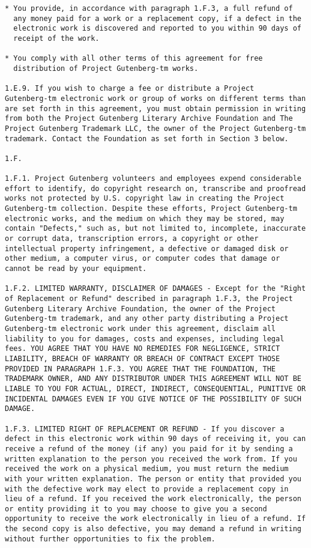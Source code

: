 \documentclass{book}[2021/07/26]
\begin{document}
\begin{mainmatter}
\begin{spacing}{1.3}
\begin{verbatim}
* You provide, in accordance with paragraph 1.F.3, a full refund of
  any money paid for a work or a replacement copy, if a defect in the
  electronic work is discovered and reported to you within 90 days of
  receipt of the work.

* You comply with all other terms of this agreement for free
  distribution of Project Gutenberg-tm works.

1.E.9. If you wish to charge a fee or distribute a Project
Gutenberg-tm electronic work or group of works on different terms than
are set forth in this agreement, you must obtain permission in writing
from both the Project Gutenberg Literary Archive Foundation and The
Project Gutenberg Trademark LLC, the owner of the Project Gutenberg-tm
trademark. Contact the Foundation as set forth in Section 3 below.

1.F.

1.F.1. Project Gutenberg volunteers and employees expend considerable
effort to identify, do copyright research on, transcribe and proofread
works not protected by U.S. copyright law in creating the Project
Gutenberg-tm collection. Despite these efforts, Project Gutenberg-tm
electronic works, and the medium on which they may be stored, may
contain "Defects," such as, but not limited to, incomplete, inaccurate
or corrupt data, transcription errors, a copyright or other
intellectual property infringement, a defective or damaged disk or
other medium, a computer virus, or computer codes that damage or
cannot be read by your equipment.

1.F.2. LIMITED WARRANTY, DISCLAIMER OF DAMAGES - Except for the "Right
of Replacement or Refund" described in paragraph 1.F.3, the Project
Gutenberg Literary Archive Foundation, the owner of the Project
Gutenberg-tm trademark, and any other party distributing a Project
Gutenberg-tm electronic work under this agreement, disclaim all
liability to you for damages, costs and expenses, including legal
fees. YOU AGREE THAT YOU HAVE NO REMEDIES FOR NEGLIGENCE, STRICT
LIABILITY, BREACH OF WARRANTY OR BREACH OF CONTRACT EXCEPT THOSE
PROVIDED IN PARAGRAPH 1.F.3. YOU AGREE THAT THE FOUNDATION, THE
TRADEMARK OWNER, AND ANY DISTRIBUTOR UNDER THIS AGREEMENT WILL NOT BE
LIABLE TO YOU FOR ACTUAL, DIRECT, INDIRECT, CONSEQUENTIAL, PUNITIVE OR
INCIDENTAL DAMAGES EVEN IF YOU GIVE NOTICE OF THE POSSIBILITY OF SUCH
DAMAGE.

1.F.3. LIMITED RIGHT OF REPLACEMENT OR REFUND - If you discover a
defect in this electronic work within 90 days of receiving it, you can
receive a refund of the money (if any) you paid for it by sending a
written explanation to the person you received the work from. If you
received the work on a physical medium, you must return the medium
with your written explanation. The person or entity that provided you
with the defective work may elect to provide a replacement copy in
lieu of a refund. If you received the work electronically, the person
or entity providing it to you may choose to give you a second
opportunity to receive the work electronically in lieu of a refund. If
the second copy is also defective, you may demand a refund in writing
without further opportunities to fix the problem.


\end{verbatim}
\end{spacing}
\end{mainmatter}
\end{document}
